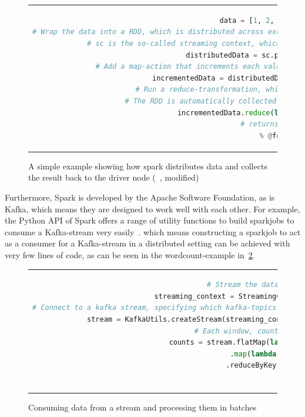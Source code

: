 \begin{figure}
    \caption{A simple example showing how spark distributes data and collects the result back to the driver node (~\cite{sparkDocs}, modified)}
    \label{code:simpleParallelization}
    \begin{tabular}{c}
        \begin{lstlisting}[language=Python]
            % @formatter:off
data = [1, 2, 3, 4, 5]
# Wrap the data into a RDD, which is distributed across execution nodes by Spark, ready for parallel processing
# sc is the so-called streaming context, which provides an interface with the cluster
distributedData = sc.parallelize(data)
# Add a map-action that increments each value, distributed across execution nodes
incrementedData = distributedData.map(lambda a: a + 1)
# Run a reduce-transformation, which is run on the driver node
# The RDD is automatically collected (persisted) to the driver node
incrementedData.reduce(lambda a, b: a + b)
# returns 20
            % @formatter:on
        \end{lstlisting}
    \end{tabular}
\end{figure}

Furthermore, Spark is developed by the Apache Software Foundation, as is Kafka,
which means they are designed to work well with each other.
For example, the Python API of Spark offers a range of utility functions to build sparkjobs to consume a Kafka-stream very easily~\cite{sparkDocs}.
which means constructing a sparkjob to act as a consumer for a Kafka-stream in a distributed setting can be achieved with very few lines of code,
as can be seen in the wordcount-example in~\ref{code:wordcount}.

\begin{figure}
    \caption{Consuming data from a stream and processing them in batches}
    \label{code:wordcount}
    \begin{tabular}{c}
        \begin{lstlisting}[language=Python]
            % @formatter:off
# Stream the data in 1-second windows
streaming_context = StreamingContext(sc, 1)  # 1 second window
# Connect to a kafka stream, specifying which kafka-topics to consume. See section "Kafka" for an explanation of topics.
stream = KafkaUtils.createStream(streaming_context, 'docker:2181', "stream-1", {"topic-1": 1})
# Each window, count each word in each line
counts = stream.flatMap(lambda line: line.split(" ")) \
    .map(lambda word: (word, 1)) \
    .reduceByKey(lambda a, b: a + b)
            % @formatter:on
        \end{lstlisting}
    \end{tabular}
\end{figure}

